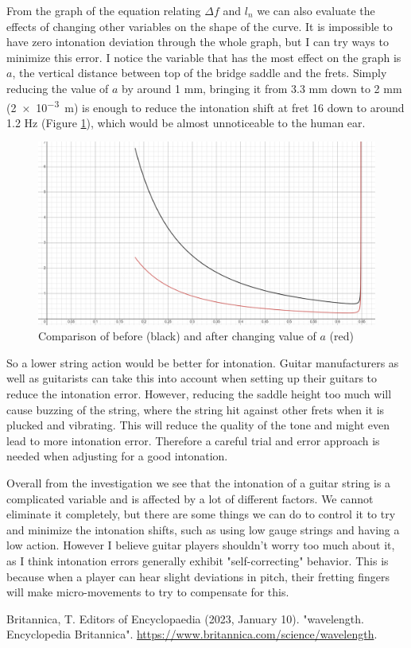 \documentclass[11pt]{article}
\begin{document}
\begin{flushleft}
        From the graph of the equation relating $\Delta f$ and $l_n$ we can also evaluate the effects of changing other variables on the shape of the curve. It is impossible to have zero intonation deviation through the whole graph, but I can try ways to minimize this error. I notice the variable that has the most effect on the graph is $a$, the vertical distance between top of the bridge saddle and the frets. Simply reducing the value of $a$ by around 1 mm, bringing it from 3.3 mm down to 2 mm (\SI{2e-3}{m}) is enough to reduce the intonation shift at fret 16 down to around 1.2 Hz (Figure \ref{fig12}), which would be almost unnoticeable to the human ear. \par
        \begin{figure}[!h]
            \includegraphics[width = \textwidth]{compare_graph_a.png}
            \caption{Comparison of before (black) and after changing value of $a$ (red)} \label{fig12}
        \end{figure}
        \FloatBarrier
        So a lower string action would be better for intonation. Guitar manufacturers as well as guitarists can take this into account when setting up their guitars to reduce the intonation error. However, reducing the saddle height too much will cause buzzing of the string, where the string hit against other frets when it is plucked and vibrating. This will reduce the quality of the tone and might even lead to more intonation error. Therefore a careful trial and error approach is needed when adjusting for a good intonation. \par
        
        Overall from the investigation we see that the intonation of a guitar string is a complicated variable and is affected by a lot of different factors. We cannot eliminate it completely, but there are some things we can do to control it to try and minimize the intonation shifts, such as using low gauge strings and having a low action. However I believe guitar players shouldn't worry too much about it, as I think intonation errors generally exhibit "self-correcting" behavior. This is because when a player can hear slight deviations in pitch, their fretting fingers will make micro-movements to try to compensate for this.
        \begin{thebibliography}{15}
            \scriptsize
             Britannica, T. Editors of Encyclopaedia (2023, January 10). "wavelength. Encyclopedia Britannica". \url{https://www.britannica.com/science/wavelength}.
            

\end{thebibliography}
\end{flushleft}
\end{document}

